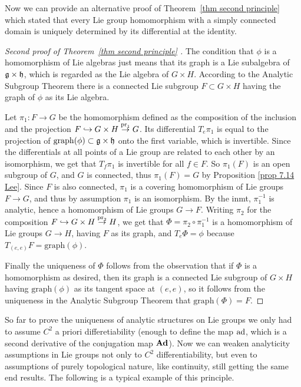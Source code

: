 Now we can provide an alternative proof of Theorem~\ref{thm second principle} which stated that every Lie group homomorphism with a simply connected domain is uniquely determined by its differential at the identity.


\begin{proof}[Second proof of Theorem~\ref{thm second principle} {{\cite[Cor.~1.10.5]{DK}}}]
    The condition that $\phi$ is a homomorphism of Lie algebras just means that its graph is a Lie subalgebra of $\mathfrak{g}\times\mathfrak{h}$, which is regarded as the Lie algebra of $G\times H$. According to the Analytic Subgroup Theorem there is a connected Lie subgroup $F\subset G\times H$ having the graph of $\phi$ as its Lie algebra.

    Let $\pi_1:F\to G$ be the homomorphism defined as the composition of the inclusion and the projection $F\hookrightarrow G\times H\overset{\operatorname{pr}_1}{\to} G$. Its differential $T_e \pi_1$ is equal to the projection of $\mathrm{graph}(\phi)\subset \mathfrak{g}\times\mathfrak{h}$ onto the first variable, which is invertible. Since the differentials at all points of a Lie group are related to each other by an isomorphism, we get that $T_f\pi_1$ is invertible for all $f\in F$. So $\pi_1(F)$ is an open subgroup of $G$, and $G$ is connected, thus $\pi_1(F)=G$ by Proposition \ref{prop 7.14 Lee}. Since $F$ is also connected, $\pi_1$ is a covering homomorphism of Lie groups $F\to G$, and thus by assumption $\pi_1$ is an isomorphism. By the \gls{inmt}, $\pi_1^{-1}$ is analytic, hence a homomorphism of Lie groups $G\to F$. Writing $\pi_2$ for the composition $F\hookrightarrow G\times H\overset{\operatorname{pr}_2}{\to} H$, we get that $\Phi=\pi_2\circ \pi_1^{-1}$ is a homomorphism of Lie groups $G\to H$, having $F$ as its graph, and $T_e \Phi=\phi$ because $T_{(e,e)}F=\mathrm{graph}(\phi)$.

    Finally the uniqueness of $\Phi$ follows from the observation that if $\Phi$ is a homomorphism as desired, then its graph is a connected Lie subgroup of $G\times H$ having $\mathrm{graph}(\phi)$ as its tangent space at $(e,e)$, so it follows from the uniqueness in the Analytic Subgroup Theorem that $\mathrm{graph}(\Phi)=F$.
\end{proof}


So far to prove the uniqueness of analytic structures on Lie groups we only had to assume $C^2$ a priori differetiability (enough to define the map $\mathrm{ad}$, which is a second derivative of the conjugation map $\mathrm{\mathbf{Ad}}$). Now we can weaken analyticity assumptions in Lie groups not only to $C^2$ differentiability, but even to assumptions of purely topological nature, like continuity, still getting the same end results. The following is a typical example of this principle.

